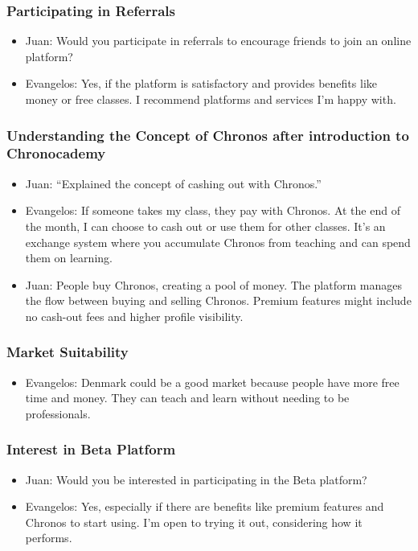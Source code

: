 \begin{enumerate}
\subsubsection*{Participating in Referrals}
\begin{itemize}
\item Juan: Would you participate in referrals to encourage friends to join an online platform?
\item Evangelos: Yes, if the platform is satisfactory and provides benefits like money or free classes.
I recommend platforms and services I’m happy with.
\end{itemize}

\subsubsection*{Understanding the Concept of Chronos after introduction to Chronocademy}
\begin{itemize}
\item Juan: “Explained the concept of cashing out with Chronos.”
\item Evangelos: If someone takes my class, they pay with Chronos.
At the end of the month, I can choose to cash out or use them for other classes.
It’s an exchange system where you accumulate Chronos from teaching and can spend them on learning.
\item Juan: People buy Chronos, creating a pool of money.
The platform manages the flow between buying and selling Chronos.
Premium features might include no cash-out fees and higher profile visibility.
\end{itemize}

\subsubsection*{Market Suitability}
\begin{itemize}
\item Evangelos: Denmark could be a good market because people have more free time and money.
They can teach and learn without needing to be professionals.
\end{itemize}

\subsubsection*{Interest in Beta Platform}
\begin{itemize}
\item Juan: Would you be interested in participating in the Beta platform?
\item Evangelos: Yes, especially if there are benefits like premium features and Chronos to start using.
I’m open to trying it out, considering how it performs.
\end{itemize}


\end{enumerate}
